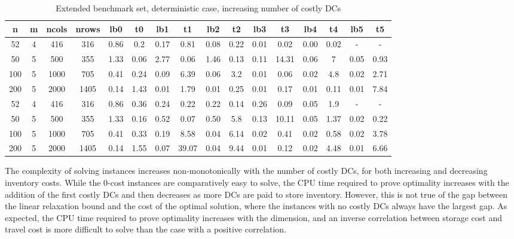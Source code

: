 \documentclass[mnsc,sglanonrev]{informs4}  %
\theoremstyle{remark}\newtheorem{remark}{Remark}
\begin{document}
\begin{APPENDICES}
\begin{table}
	\addtolength{\tabcolsep}{-3pt}
	\footnotesize 
	\centering
	\renewcommand{\arraystretch}{1}
	\begin{tabular}{cccc|cc|cc|cc|cc|cc|cc}
		n & m & ncols & nrows & lb0 & t0 & lb1 & t1 & lb2 & t2 & lb3 & t3 & lb4 & t4 & lb5 & t5 \\
		\hline
		52 & 4  & 416 & 316 & 0.86 & 0.2 & 0.17 & 0.81 & 0.08 & 0.22 & 0.01 & 0.02 & 0.00 & 0.02 & - & - \\
		50 & 5  & 500 & 355 & 1.33 & 0.06 & 2.77 & 0.06 & 1.46 & 0.13 & 0.11 & 14.31 & 0.06 & 7 & 0.05 & 0.93 \\
		100 & 5 & 1000 & 705 & 0.41 & 0.24 & 0.09 & 6.39 & 0.06 & 3.2 & 0.01 & 0.06 & 0.02 & 4.8 & 0.02 & 2.71 \\
		200 & 5 & 2000 & 1405 & 0.14 & 1.43 & 0.01 & 1.79 & 0.01 & 0.25 & 0.01 & 0.17 & 0.01 & 0.11 & 0.01 & 7.84 \\
		\hline
		52 & 4  & 416 & 316 & 0.86 & 0.36 & 0.24 & 0.22 & 0.22 & 0.14 & 0.26 & 0.09 & 0.05 & 1.9 & - & - \\
		50 & 5  & 500 & 355 & 1.33 & 0.16 & 0.52 & 0.07 & 0.50 & 5.8 & 0.13 & 10.11 & 0.05 & 1.37 & 0.02 & 0.22 \\
		100 & 5 & 1000 & 705 & 0.41 & 0.33 & 0.19 & 8.58 & 0.04 & 6.14 & 0.02 & 0.41 & 0.02 & 0.58 & 0.02 & 3.78 \\
		200 & 5 & 2000 & 1405 & 0.14 & 1.55 & 0.07 & 39.07 & 0.04 & 9.44 & 0.01 & 0.12 & 0.02 & 4.48 & 0.01 & 6.66 \\
		\hline
	\end{tabular}
	\caption{Extended benchmark set, deterministic case, increasing number of costly DCs}
	\label{table:extsetq}
\end{table}

The complexity of solving instances increases non-monotonically with the number of costly DCs, for both increasing and decreasing inventory costs. While the 0-cost instances are comparatively easy to solve, the CPU time required to prove optimality increases with the addition of the first costly DCs and then decreases as more DCs are paid to store inventory. However, this is not true of the gap between the linear relaxation bound and the cost of the optimal solution, where the instances with no costly DCs always have the largest gap.
As expected, the CPU time required to prove optimality increases with the dimension, and an inverse correlation between storage cost and travel cost is more difficult to solve than the case with a positive correlation.


\end{APPENDICES}
\end{document}

